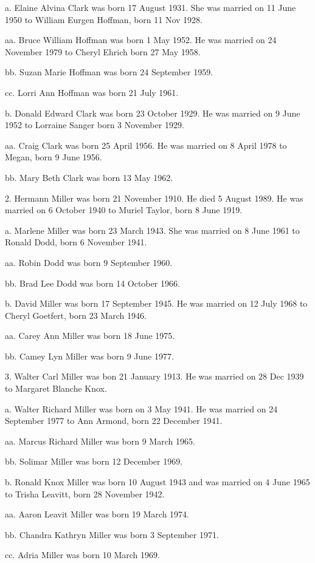 \documentclass[a4paper]{article}
\begin{document}
a. Elaine Alvina Clark was born 17 August 1931.  She was married on 11 June 1950 to William Eurgen Hoffman, born 11 Nov 1928.

aa. Bruce William Hoffman was born 1 May 1952.  He was married on 24 November 1979 to Cheryl Ehrich born 27 May 1958.

bb. Suzan Marie Hoffman was born 24 September 1959.

cc. Lorri Ann Hoffman was born 21 July 1961.

b. Donald Edward Clark was born 23 October 1929.  He was married on 9 June 1952 to Lorraine Sanger born 3 November 1929.
 
aa. Craig Clark was born 25 April 1956.  He was married on 8 April 1978 to Megan, born 9 June 1956.
				
bb. Mary Beth Clark was born 13 May 1962.

2. Hermann Miller was born 21 November 1910. He died 5 August 1989. He was married on 6 October 1940 to Muriel Taylor, born 8 June 1919.

a. Marlene Miller was born 23 March 1943.  She was married on 8 June 1961 to Ronald Dodd, born 6 November 1941.

aa. Robin Dodd was born 9 September 1960.

bb. Brad Lee Dodd was born 14 October 1966.

b. David Miller was born 17 September 1945.  He was married on 12 July 1968 to Cheryl Goetfert, born 23 March 1946.

aa. Carey Ann Miller was born 18 June 1975.

bb. Camey Lyn Miller was born 9 June 1977.

3. Walter Carl Miller was bon 21 January 1913.  He was married on 28 Dec 1939 to Margaret Blanche Knox.

a. Walter Richard Miller was born on 3 May 1941.  He was married on 24 September 1977 to Ann Armond, born 22 December 1941.

aa. Marcus Richard Miller was born 9 March 1965.

bb. Solimar Miller was born 12 December 1969.

b. Ronald Knox Miller was born 10 August 1943 and was married on 4 June 1965 to Trisha Leavitt, born 28 November 1942.

aa. Aaron Leavit Miller was born 19 March 1974.

bb. Chandra Kathryn Miller was born 3 September 1971.

cc. Adria Miller was born 10 March 1969.
\end{document}
